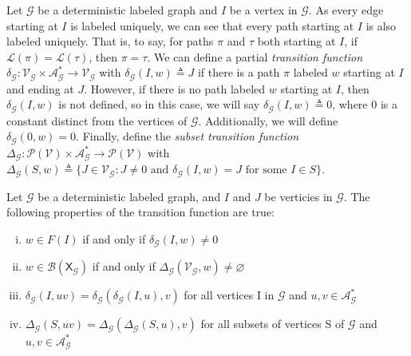 \documentclass[hidelinks]{article}
\newcommand{\Ac}{\mathcal{A}}  %
\newcommand{\Lc}{\mathcal{L}}  %
\newcommand{\Gc}{\mathcal{G}}  %
\newcommand{\Vc}{\mathcal{V}}
\newcommand{\Bc}{\mathcal{B}}
\newcommand{\shift}[1]{\mathsf{X}_{#1}}
\newcommand{\term}[1]{\textit{#1}}
\theoremstyle{definition}
\begin{document}
Let \(\Gc\) be a deterministic labeled graph and \(I\) be a vertex in \(\Gc\). 
As every edge starting at \(I\) is labeled uniquely, we can see 
that every path starting at \(I\) is also labeled uniquely. That is, to say, for paths 
\(\pi\) and \(\tau\) both starting at \(I\), if \(\Lc(\pi) = \Lc(\tau)\), then \(\pi = \tau\). We can 
define a partial \term{transition function} \(\delta_\Gc : \Vc_\Gc \times \Ac_\Gc^* \to \Vc_\Gc\) 
with \(\delta_\Gc(I, w) \triangleq J\) if there is a path \(\pi\) labeled \(w\) starting 
at \(I\) and ending at \(J\). However, if there is no path labeled \(w\) starting at \(I\),
then \(\delta_\Gc(I, w)\) is not defined, so in this case, we will say \(\delta_\Gc(I, w) \triangleq 0\),
where \(0\) is a constant distinct from the vertices of \(\Gc\). Additionally, we 
will define \(\delta_\Gc(0, w) = 0\). Finally, define 
the \term{subset transition function} \(\Delta_\Gc : \mathcal{P}(\Vc) \times \Ac_\Gc^* \to \mathcal{P}(\Vc)\)
with \(\Delta_\Gc(S, w) \triangleq \{ J \in \Vc_\Gc : J \neq 0 \text{ and } \delta_\Gc(I, w) = J \text{ for some } I \in S\}\).

\begin{proposition}\label{deltaprops}
    Let \(\Gc\) be a deterministic labeled graph, and \(I\) and \(J\) be verticies in \(\Gc\). The following properties of the 
    transition function are true:

    \begin{enumerate}[(i)]
        \item \(w \in F(I)\) if and only if \(\delta_\Gc(I, w) \neq 0\)
        \item \(w \in \Bc(\shift\Gc)\) if and only if \(\Delta_\Gc(\Vc_\Gc, w) \neq \varnothing\)
        \item \(\delta_\Gc(I, uv) = \delta_\Gc(\delta_\Gc(I, u), v)\) for all vertices I in \(\Gc\) and \(u, v \in \Ac_\Gc^*\)
        \item \(\Delta_\Gc(S, uv) = \Delta_\Gc(\Delta_\Gc(S, u), v)\) for all subsets of vertices S of \(\Gc\) and \(u, v \in \Ac_\Gc^*\)
    \end{enumerate}
\end{proposition}
\end{document}
